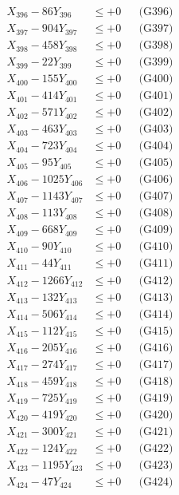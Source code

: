 \documentclass[a4paper,10pt]{article}
\begin{document}
{\begin{align}
X_{396} - 86Y_{396} &\leq +0 && \text{(G396)} \\
X_{397} - 904Y_{397} &\leq +0 && \text{(G397)} \\
X_{398} - 458Y_{398} &\leq +0 && \text{(G398)} \\
X_{399} - 22Y_{399} &\leq +0 && \text{(G399)} \\
X_{400} - 155Y_{400} &\leq +0 && \text{(G400)} \\
\allowbreak
X_{401} - 414Y_{401} &\leq +0 && \text{(G401)} \\
X_{402} - 571Y_{402} &\leq +0 && \text{(G402)} \\
X_{403} - 463Y_{403} &\leq +0 && \text{(G403)} \\
X_{404} - 723Y_{404} &\leq +0 && \text{(G404)} \\
X_{405} - 95Y_{405} &\leq +0 && \text{(G405)} \\
X_{406} - 1025Y_{406} &\leq +0 && \text{(G406)} \\
X_{407} - 1143Y_{407} &\leq +0 && \text{(G407)} \\
X_{408} - 113Y_{408} &\leq +0 && \text{(G408)} \\
X_{409} - 668Y_{409} &\leq +0 && \text{(G409)} \\
X_{410} - 90Y_{410} &\leq +0 && \text{(G410)} \\
\allowbreak
X_{411} - 44Y_{411} &\leq +0 && \text{(G411)} \\
X_{412} - 1266Y_{412} &\leq +0 && \text{(G412)} \\
X_{413} - 132Y_{413} &\leq +0 && \text{(G413)} \\
X_{414} - 506Y_{414} &\leq +0 && \text{(G414)} \\
X_{415} - 112Y_{415} &\leq +0 && \text{(G415)} \\
X_{416} - 205Y_{416} &\leq +0 && \text{(G416)} \\
X_{417} - 274Y_{417} &\leq +0 && \text{(G417)} \\
X_{418} - 459Y_{418} &\leq +0 && \text{(G418)} \\
X_{419} - 725Y_{419} &\leq +0 && \text{(G419)} \\
X_{420} - 419Y_{420} &\leq +0 && \text{(G420)} \\
\allowbreak
X_{421} - 300Y_{421} &\leq +0 && \text{(G421)} \\
X_{422} - 124Y_{422} &\leq +0 && \text{(G422)} \\
X_{423} - 1195Y_{423} &\leq +0 && \text{(G423)} \\
X_{424} - 47Y_{424} &\leq +0 && \text{(G424)} \\

\end{align}}
\end{document}
